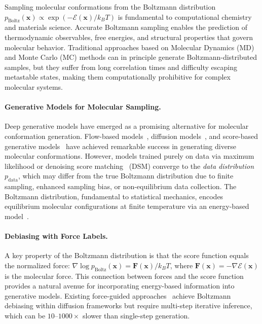 \documentclass[11pt]{article}
\newcommand{\bx}{\mathbf{x}}
\newcommand{\bF}{\mathbf{F}}
\newcommand{\pboltz}{p_{\text{Boltz}}}
\newcommand{\pdata}{p_{\text{data}}}
\newcommand{\kBT}{k_BT}
\begin{document}
Sampling molecular conformations from the Boltzmann distribution $\pboltz(\bx) \propto \exp(-\mathcal{E}(\bx)/\kBT)$ is fundamental to computational chemistry and materials science.
Accurate Boltzmann sampling enables the prediction of thermodynamic observables, free energies, and structural properties that govern molecular behavior.
Traditional approaches based on Molecular Dynamics (MD) and Monte Carlo (MC) methods can in principle generate Boltzmann-distributed samples, but they suffer from long correlation times and difficulty escaping metastable states, making them computationally prohibitive for complex molecular systems.

\paragraph{Generative Models for Molecular Sampling.}
Deep generative models have emerged as a promising alternative for molecular conformation generation.
Flow-based models~\citep{noe2019boltzmann}, diffusion models~\citep{xu2022geodiff,jing2022torsional}, and score-based generative models~\citep{song2021scorebased} have achieved remarkable success in generating diverse molecular conformations.
However, models trained purely on data via maximum likelihood or denoising score matching~\citep{hyvarinen2005estimation} (DSM) converge to the \emph{data distribution} $\pdata$, which may differ from the true Boltzmann distribution due to finite sampling, enhanced sampling bias, or non-equilibrium data collection.
The Boltzmann distribution, fundamental to statistical mechanics, encodes equilibrium molecular configurations at finite temperature via an energy-based model~\citep{lecun2006tutorial}.

\paragraph{Debiasing with Force Labels.}
A key property of the Boltzmann distribution is that the score function equals the normalized force: $\nabla \log \pboltz(\bx) = \bF(\bx)/\kBT$, where $\bF(\bx) = -\nabla\mathcal{E}(\bx)$ is the molecular force.
This connection between forces and the score function provides a natural avenue for incorporating energy-based information into generative models.
Existing force-guided approaches~\citep{arts2023two} achieve Boltzmann debiasing within diffusion frameworks but require multi-step iterative inference, which can be $10$--$1000\times$ slower than single-step generation.
\end{document}
